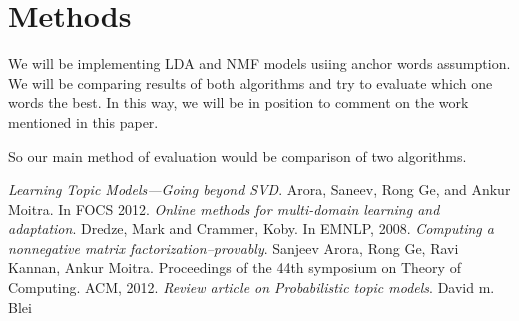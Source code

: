 \documentclass[a4paper,11pt]{article}
\begin{document}
\section{Methods}
We will be implementing LDA and NMF models usiing anchor words assumption. We will be comparing results of both algorithms and try to evaluate which one words the best. In this way, we will be in position to comment on the work mentioned in this paper. 

So our main method of evaluation would be comparison of two algorithms. 


\begin{thebibliography}{99}
 \textit{Learning Topic Models---Going beyond SVD}. Arora, Saneev, Rong Ge, and Ankur Moitra. In FOCS 2012.
 \textit{Online methods for multi-domain learning and adaptation}. Dredze, Mark and Crammer, Koby. In
EMNLP, 2008.
 \textit{Computing a nonnegative matrix factorization--provably}. Sanjeev Arora, Rong Ge, Ravi Kannan, Ankur Moitra. Proceedings of the 44th symposium on Theory of Computing. ACM, 2012.  
 \textit{Review article on Probabilistic topic models}. David m. Blei  
\end{thebibliography}




\pagebreak
\end{document}
